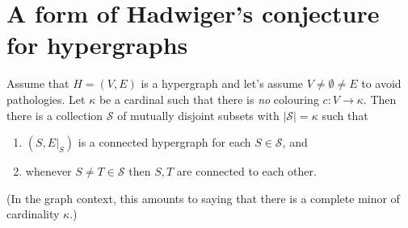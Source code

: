 \documentclass[12pt, a4paper]{amsart}
\begin{document}
\section{A form of Hadwiger's conjecture for hypergraphs}

Assume that $H=(V,E)$ is a hypergraph and let's assume 
$V\neq \emptyset \neq E$ to avoid pathologies. Let $\kappa$ be a
cardinal such that there is {\em no} colouring $c:V\to \kappa$. 
Then there is a collection ${\mathcal S}$ of  mutually
disjoint subsets with $|{\mathcal S}| = \kappa$ such that
\begin{enumerate}
	\item $(S, E|_S)$ is a connected hypergraph for each 
		$S\in {\mathcal S}$, and 
	\item whenever $S\neq T\in {\mathcal S}$ then $S, T$ are connected
	to each other.
\end{enumerate}
(In the graph context, this amounts to saying that there
is a complete minor of cardinality $\kappa$.)
\end{document}
